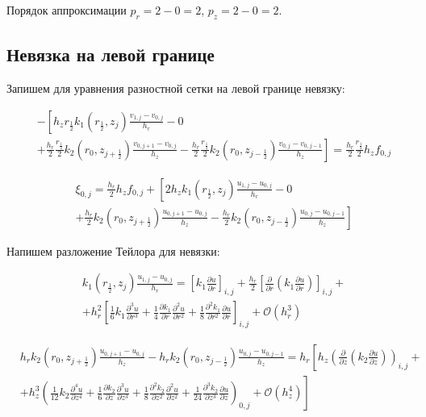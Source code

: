 Порядок аппроксимации $p_r = 2 - 0 = 2 $, $ p_z = 2 - 0 = 2 $.

\subsection{Невязка на левой границе}

Запишем для уравнения разностной сетки на левой границе невязку:

\begin{align*}
  &- \left [ 
    h_z r_{\frac{1}{2}} k_1(r_{\frac{1}{2}}, z_j) \frac{v_{1, j} - v_{0, j}}{h_{r}}
    - 0
    \right . \\
    &\left .
    + \frac{h_r}{2} \frac{r_{\frac{1}{2}}}{2} k_2(r_0, z_{j+\frac{1}{2}}) \frac{v_{0, j + 1} - v_{0, j}}{h_{z}}
    - \frac{h_r}{2} \frac{r_{\frac{1}{2}}}{2} k_2(r_0, z_{j-\frac{1}{2}}) \frac{v_{0, j} - v_{0, j - 1}}{h_z}
    \right ]  = \frac{h_r}{2} \frac{r_{\frac{1}{2}}}{2} h_z f_{0, j}
\end{align*}

\begin{align*}
  &\xi_{0, j} = \frac{h_r}{2}  h_z f_{0, j} + \left [ 
    2 h_z k_1(r_{\frac{1}{2}}, z_j) \frac{u_{1, j} - u_{0, j}}{h_{r}}
    - 0
    \right . \\
    &\left .
    + \frac{h_r}{2} k_2(r_0, z_{j+\frac{1}{2}}) \frac{u_{0, j + 1} - u_{0, j}}{h_{z}}
    - \frac{h_r}{2} k_2(r_0, z_{j-\frac{1}{2}}) \frac{u_{0, j} - u_{0, j - 1}}{h_z}
    \right ]
\end{align*}

Напишем разложение Тейлора для невязки:

\begin{align*}
  &k_1(r_\frac{1}{2}, z_j) \frac{u_{1, j} - u_{0, j}}{h_r} = \left[ k_1 \frac{\partial u}{ \partial r} \right]_{i, j}
  + \frac{h_r}{2} \left[ \frac{\partial }{ \partial r} \left( k_1 \frac{\partial u}{ \partial r} \right) \right]_{i, j} + \\
  &+ h^2_r \left[
    \frac{1}{6}k_1 \frac{\partial^3 u}{ \partial r^3} +
    \frac{1}{4} \frac{\partial k_1}{ \partial r} \frac{\partial^2 u}{ \partial r^2} +
    \frac{1}{8} \frac{\partial^2 k_1}{ \partial r^2} \frac{\partial u}{ \partial r}
  \right]_{i ,j} + \mathcal{O}(h^3_r)
\end{align*}

\begin{align*}
  &h_r k_2(r_0, z_{j + \frac{1}{2}}) \frac{u_{0, j + 1} - u_{0, j}}{h_z} -
  h_r k_2(r_0, z_{j - \frac{1}{2}}) \frac{u_{0, j} - u_{0, j - 1}}{h_z} =
  h_r \left[ h_z \left( \frac{\partial }{ \partial z} \left( k_2 \frac{\partial u}{ \partial z} \right) \right)_{i, j} \right. + \\
  &\left. + h^3_z \left( 
    \frac{1}{12}k_2 \frac{\partial^4 u}{ \partial z^4}  +
    \frac{1}{6} \frac{\partial k_2}{ \partial z} \frac{\partial^3 u}{ \partial z^3} +
    \frac{1}{8} \frac{\partial^2 k_2}{ \partial z^2} \frac{\partial^2 u}{ \partial z^2} +
    \frac{1}{24} \frac{\partial^3 k_2}{ \partial z^3} \frac{\partial u}{ \partial z} \right)_{0, j}
    + \mathcal{O}(h^4_z)
  \right]
\end{align*}

